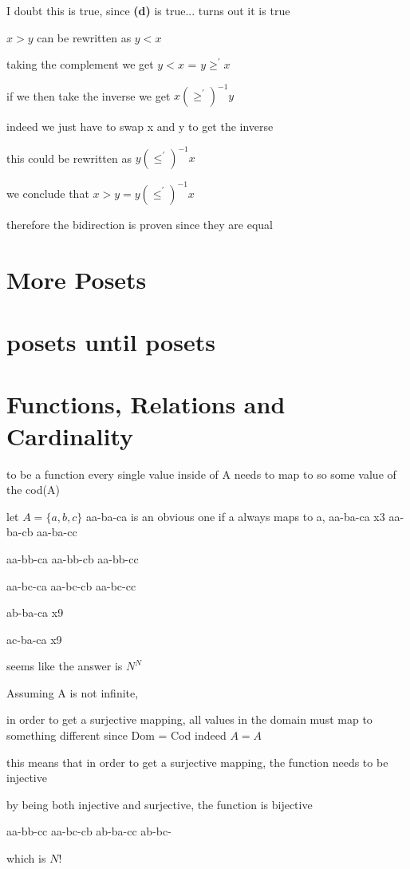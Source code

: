 \documentclass[12pts,A4]{article}
\begin{document}
\begin{flushleft}
    I doubt this is true, since \textbf{(d)} is true...
    turns out it is true

    $ x > y $ can be rewritten as $ y < x$

    
    taking the complement we get  $ y < x$ = $ y \geq ^{'} x $
   
    if we then take the inverse we get $ x (\geq ^{'} )^{-1} y $
    
    indeed we just have to swap x and y to get the inverse
    
    this could be rewritten as $ y (\leq ^{'} )^{-1} x $
    \bigskip

    we conclude that $ x > y =  y (\leq^{'})^{-1} x $  

    therefore the bidirection is proven since they are equal


\end{flushleft}
\section {More Posets}

\section{posets until posets}

\section{Functions, Relations and Cardinality}

\begin{flushleft}

    to be a function every single value inside of A needs to map to so
    some value of the cod(A)

    let $A = \{ a,b,c \}$
    aa-ba-ca is an obvious one
    if a always maps to a,
    aa-ba-ca x3
    aa-ba-cb
    aa-ba-cc

    aa-bb-ca
    aa-bb-cb
    aa-bb-cc
    
    aa-bc-ca
    aa-bc-cb
    aa-bc-cc
    

    ab-ba-ca
    x9

    ac-ba-ca
    x9
    
    seems like the answer is $N^{N}$
    \bigskip


    Assuming A is not infinite,


    in order to get a surjective mapping, all values in the domain
    must map to something different since Dom = Cod indeed $A = A$

    this means that in order to get a surjective mapping, the function
    needs to be injective
    
    by being both injective and surjective, the function is bijective

    aa-bb-cc aa-bc-cb ab-ba-cc ab-bc-

    which is $N!$
\end{flushleft}
\end{document}
